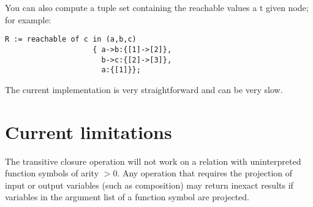 You can also compute a tuple set containing the reachable values a t
given node; for example:

\begin{verbatim}
R := reachable of c in (a,b,c)
	                { a->b:{[1]->[2]},
	                  b->c:{[2]->[3]},
	                  a:{[1]}};
\end{verbatim}

The current implementation is very straightforward and can be very slow.

\section{Current limitations}

The transitive closure operation will not work on a relation with
uninterpreted function symbols of arity $> 0$.  Any operation that
requires the projection of input or output variables (such as
composition) may return inexact results if variables in the argument
list of a function symbol are projected.








 

